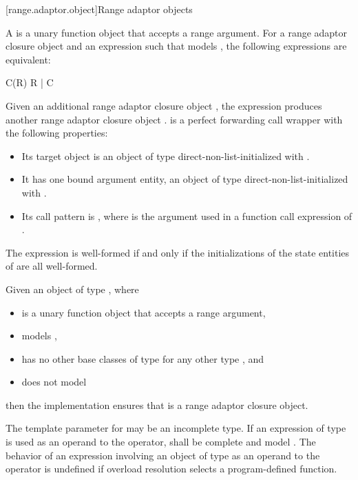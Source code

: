 [range.adaptor.object]{Range adaptor objects}

%
\pnum
A  is a unary function object that accepts
a range argument. For
a range adaptor closure object  and an expression  such that
 models , the following
expressions are equivalent:
\begin{codeblock}
C(R)
R | C
\end{codeblock}
Given an additional range adaptor closure object ,
the expression  produces another range adaptor
closure object .
 is a perfect forwarding call wrapper
with the following properties:
\begin{itemize}
\item
Its target object is an object  of type 
direct-non-list-initialized with .
\item
It has one bound argument entity,
an object  of type 
direct-non-list-initialized with .
\item
Its call pattern is ,
where  is the argument used in
a function call expression of .
\end{itemize}
The expression  is well-formed if and only if
the initializations of the state entities of  are all well-formed.

\pnum
Given an object  of type , where
\begin{itemize}
\item
{} is a unary function object that accepts a range argument,
\item
{} models ,
\item
{} has no other base classes of type  for any other type , and
\item
{} does not model 
\end{itemize}
then the implementation ensures
that  is a range adaptor closure object.

\pnum
The template parameter  for 
may be an incomplete type.
If an expression of type \cv{} 
is used as an operand to the \tcode{|} operator,
 shall be complete and
model .
The behavior of an expression involving an object of type \cv{} 
as an operand to the \tcode{|} operator is undefined
if overload resolution selects a program-defined  function.


